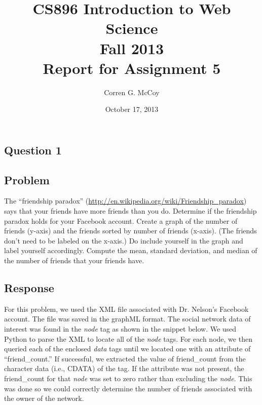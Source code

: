 \documentclass[letterpaper,11pt]{report}
\begin{document}
 
\begin{savenotes}
\pagestyle{plain}
\title{CS896 Introduction to Web Science\\Fall 2013\\Report for Assignment 5}
\author{Corren G. McCoy}
 
\date{October 17, 2013}
\maketitle

\renewcommand*\thesection{\arabic{section}}
\setcounter{section}{0}

\setcounter{tocdepth}{4}
\tableofcontents
 \listoffigures
 \listoftables
\newpage


\section{Question 1}
\subsection{Problem}The ``friendship paradox'' (\url{http://en.wikipedia.org/wiki/Friendship_paradox}) says that your friends have more friends than you do. Determine if the friendship paradox holds for your Facebook account.  Create a graph of the number of friends (y-axis) and the friends sorted by number of friends (x-axis).  (The friends don't need to be labeled on the x-axis.)  Do include yourself in the graph and label yourself accordingly. Compute the mean, standard deviation, and median of the number of friends that your friends have.
\subsection{Response}For this problem, we used the XML file associated with Dr. Nelson's Facebook account. The file was saved in the graphML format. The social network data of interest was found in the \emph{node} tag as shown in the snippet below. We used Python to parse the XML to locate all of the \emph{node} tags. For each node, we then queried each of the enclosed \emph{data} tags until we located one with an attribute of ``friend\_count.'' If successful, we extracted the value of friend\_count from the character data (i.e., CDATA) of the tag. If the attribute was not present, the friend\_count for that \emph{node} was set to zero rather than excluding the \emph{node}. This was done so we could correctly determine the number of friends associated with the owner of the network. 


\end{savenotes}
\end{document}
